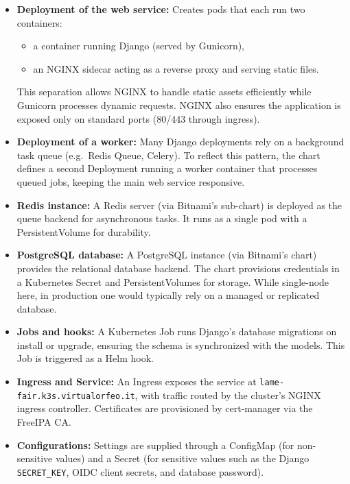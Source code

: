 \begin{itemize}
	\item \textbf{Deployment of the web service:}  
	Creates pods that each run two containers:  
	\begin{itemize}
		\item a container running Django (served by Gunicorn),  
		\item an NGINX sidecar acting as a reverse proxy and serving static files.  
	\end{itemize}  
	This separation allows NGINX to handle static assets efficiently while 
	Gunicorn processes dynamic requests. NGINX also ensures the application is 
	exposed only on standard ports (80/443 through ingress).  
	
	\item \textbf{Deployment of a worker:}  
	Many Django deployments rely on a background task queue (e.g.\ Redis Queue, 
	Celery). To reflect this pattern, the chart defines a second Deployment 
	running a worker container that processes queued jobs, keeping the main web 
	service responsive.  
	
	\item \textbf{Redis instance:}  
	A Redis server (via Bitnami’s sub-chart) is deployed as the queue backend for 
	asynchronous tasks. It runs as a single pod with a PersistentVolume for 
	durability.  
	
	\item \textbf{PostgreSQL database:}  
	A PostgreSQL instance (via Bitnami’s chart) provides the relational database 
	backend. The chart provisions credentials in a Kubernetes Secret and 
	PersistentVolumes for storage. While single-node here, in production one would 
	typically rely on a managed or replicated database.  
	
	\item \textbf{Jobs and hooks:}  
	A Kubernetes Job runs Django’s database migrations on install or upgrade, 
	ensuring the schema is synchronized with the models. This Job is triggered as 
	a Helm hook.  
	
	\item \textbf{Ingress and Service:}  
	An Ingress exposes the service at 
	\texttt{lame-fair.k3s.virtualorfeo.it}, with traffic routed by the cluster’s 
	NGINX ingress controller. Certificates are provisioned by cert-manager via the 
	FreeIPA CA.  
	
	\item \textbf{Configurations:}  
	Settings are supplied through a ConfigMap (for non-sensitive values) and a 
	Secret (for sensitive values such as the Django \texttt{SECRET\_KEY}, OIDC 
	client secrets, and database password).  
\end{itemize}

